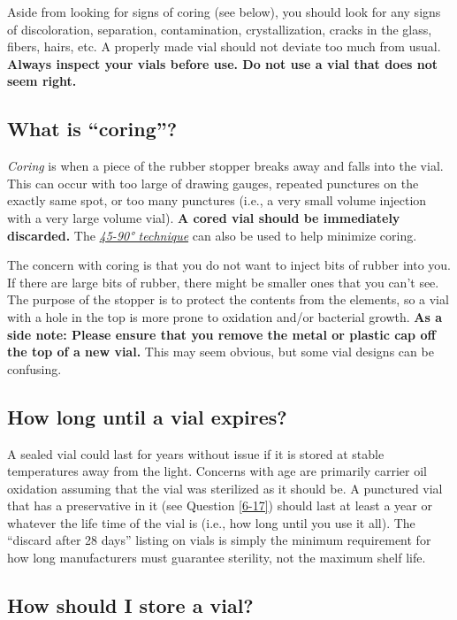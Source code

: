\documentclass{article}
\begin{document}
Aside from looking for signs of coring (see below), you should look for any signs of discoloration, separation, contamination, crystallization, cracks in the glass, fibers, hairs, etc. A properly made vial should not deviate too much from usual. \textbf{Always inspect your vials before use. Do not use a vial that does not seem right.}

\subsection{What is “coring”?}\label{5-23}

\textit{Coring} is when a piece of the rubber stopper breaks away and falls into the vial. This can occur with too large of drawing gauges, repeated punctures on the exactly same spot, or too many punctures (i.e., a very small volume injection with a very large volume vial). \textbf{A cored vial should be immediately discarded.} The \href{https://www.youtube.com/watch?v=w5F0SLoMjC8}{\textit{45-90° technique}} can also be used to help minimize coring.

The concern with coring is that you do not want to inject bits of rubber into you. If there are large bits of rubber, there might be smaller ones that you can't see. The purpose of the stopper is to protect the contents from the elements, so a vial with a hole in the top is more prone to oxidation and/or bacterial growth. \textbf{As a side note: Please ensure that you remove the metal or plastic cap off the top of a new vial.} This may seem obvious, but some vial designs can be confusing.

\subsection{How long until a vial expires?}

A sealed vial could last for years without issue if it is stored at stable temperatures away from the light. Concerns with age are primarily carrier oil oxidation assuming that the vial was sterilized as it should be. A punctured vial that has a preservative in it (see Question \ref{6-17}) should last at least a year or whatever the life time of the vial is (i.e., how long until you use it all). The “discard after 28 days” listing on vials is simply the minimum requirement for how long manufacturers must guarantee sterility, not the maximum shelf life.

\subsection{How should I store a vial?}\label{5-25}
\end{document}
